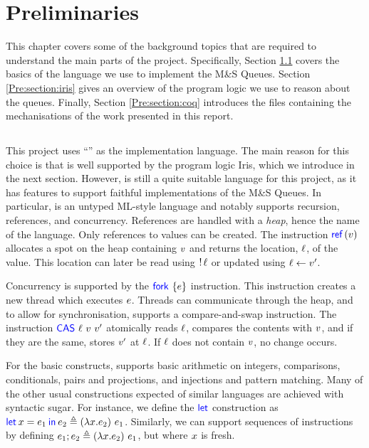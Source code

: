 \documentclass[a4paper, 10pt]{report}
\theoremstyle{definition}
\newcommand{\msq}{M\&S Queue}
\begin{document}

\chapter{Preliminaries}
\label{ch:pre}

This chapter covers some of the background topics that are required to understand the main parts of the project. Specifically, Section \ref{Pre:section:heaplang} covers the basics of the language we use to implement the \msq{}s. Section \ref{Pre:section:iris} gives an overview of the program logic we use to reason about the queues. Finally, Section \ref{Pre:section:coq} introduces the files containing the mechanisations of the work presented in this report.

\section{\heaplang}
\label{Pre:section:heaplang}

This project uses ``\heaplang'' as the implementation language. The main reason for this choice is that \heaplang is well supported by the program logic Iris, which we introduce in the next section. However, \heaplang is still a quite suitable language for this project, as it has features to support faithful implementations of the \msq{}s. In particular, \heaplang is an untyped ML-style language and notably supports recursion, references, and concurrency. References are handled with a \textit{heap}, hence the name of the language. Only references to values can be created. The instruction $\Ref(\val)$ allocates a spot on the heap containing $v$ and returns the location, $\ell$, of the value. This location can later be read using $\mathop{!} \ell$ or updated using $\ell \leftarrow v'$.

Concurrency is supported by the $\Fork{\expr}$ instruction. This instruction creates a new thread which executes $e$. Threads can communicate through the heap, and to allow for synchronisation, \heaplang supports a compare-and-swap instruction. The instruction $\CAS \ \loc \ \val \ \val'$ atomically reads $\ell$, compares the contents with $v$, and if they are the same, stores $v'$ at $\ell$. If $\ell$ does not contain $v$, no change occurs.

For the basic constructs, \heaplang supports basic arithmetic on integers, comparisons, conditionals, pairs and projections, and injections and pattern matching. Many of the other usual constructions expected of similar languages are achieved with syntactic sugar. For instance, we define the $\textsf{\color{blue} let}$ construction as $\Let \var = \expr_1 in \expr_2 \eqdef (\lambda{} \var . \expr_2) ~ \expr_1$. Similarly, we can support sequences of instructions by defining $e_1 ; e_2 \triangleq (\lambda{} x . e_2) ~ e_1$, but where $x$ is fresh.
\end{document}
